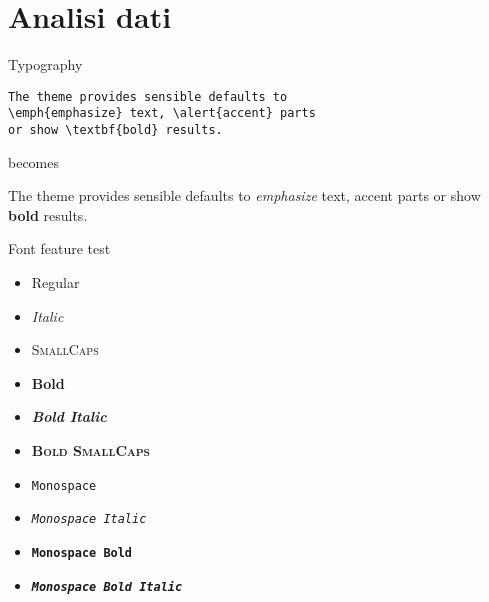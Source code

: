 \documentclass[10pt]{beamer}
\begin{document}

\section{Analisi dati}

\begin{frame}[fragile]{Typography}
      \begin{verbatim}The theme provides sensible defaults to
\emph{emphasize} text, \alert{accent} parts
or show \textbf{bold} results.\end{verbatim}

  \begin{center}becomes\end{center}

  The theme provides sensible defaults to \emph{emphasize} text,
  \alert{accent} parts or show \textbf{bold} results.
\end{frame}

\begin{frame}{Font feature test}
  \begin{itemize}
    \item Regular
    \item \textit{Italic}
    \item \textsc{SmallCaps}
    \item \textbf{Bold}
    \item \textbf{\textit{Bold Italic}}
    \item \textbf{\textsc{Bold SmallCaps}}
    \item \texttt{Monospace}
    \item \texttt{\textit{Monospace Italic}}
    \item \texttt{\textbf{Monospace Bold}}
    \item \texttt{\textbf{\textit{Monospace Bold Italic}}}
  \end{itemize}
\end{frame}
\end{document}
